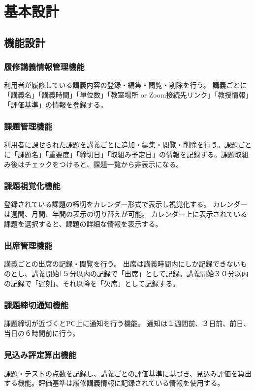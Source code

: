 \documentclass[a4paper, 11pt, titlepage]{jsarticle}
\begin{document}
\clearpage

\section{基本設計}
\subsection{機能設計}
\subsubsection{履修講義情報管理機能}
利用者が履修している講義内容の登録・編集・閲覧・削除を行う。
講義ごとに「講義名」「講義時間」「単位数」「教室場所 or Zoom接続先リンク」「教授情報」「評価基準」の情報を登録する。
\subsubsection{課題管理機能}
利用者に課せられた課題を講義ごとに追加・編集・閲覧・削除を行う。課題ごとに「課題名」「重要度」「締切日」「取組み予定日」の情報を記録する。課題取組み後はチェックをつけると、課題一覧から非表示になる。
\subsubsection{課題視覚化機能}
登録されている課題の締切をカレンダー形式で表示し視覚化する。
カレンダーは週間、月間、年間の表示の切り替えが可能。
カレンダー上に表示されている課題を選択すると、課題の詳細な情報を表示する。
\subsubsection{出席管理機能}
講義ごとの出席の記録・閲覧を行う。
出席は講義時間内にしか記録できないものとし、講義開始1５分以内の記録で「出席」として記録。講義開始３０分以内の記録で「遅刻」、それ以降を「欠席」として記録する。
\subsubsection{課題締切通知機能}
課題締切が近づくとPC上に通知を行う機能。
通知は１週間前、３日前、前日、当日の６時間前に行う。
\subsubsection{見込み評定算出機能}
課題・テストの点数を記録し、講義ごとの評価基準に基づき、見込み評価を算出する機能。評価基準は履修講義情報に記録されている情報を使用する。
\end{document}
